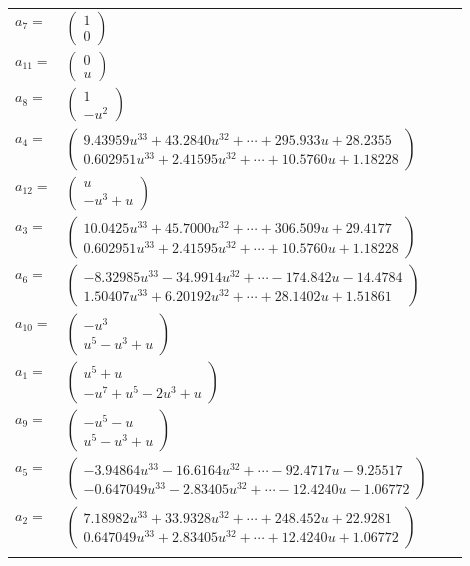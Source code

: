 \documentclass[1p]{elsarticle_modified}
\theoremstyle{definition}
\begin{document}
\begin{tabular}{m{7pt} m{180pt} m{7pt} m{180pt} }
\flushright $a_{7}=$&$\begin{pmatrix}1\\0\end{pmatrix}$ \\
\flushright $a_{11}=$&$\begin{pmatrix}0\\u\end{pmatrix}$ \\
\flushright $a_{8}=$&$\begin{pmatrix}1\\- u^2\end{pmatrix}$ \\
\flushright $a_{4}=$&$\begin{pmatrix}9.43959 u^{33}+43.2840 u^{32}+\cdots+295.933 u+28.2355\\0.602951 u^{33}+2.41595 u^{32}+\cdots+10.5760 u+1.18228\end{pmatrix}$ \\
\flushright $a_{12}=$&$\begin{pmatrix}u\\- u^3+u\end{pmatrix}$ \\
\flushright $a_{3}=$&$\begin{pmatrix}10.0425 u^{33}+45.7000 u^{32}+\cdots+306.509 u+29.4177\\0.602951 u^{33}+2.41595 u^{32}+\cdots+10.5760 u+1.18228\end{pmatrix}$ \\
\flushright $a_{6}=$&$\begin{pmatrix}-8.32985 u^{33}-34.9914 u^{32}+\cdots-174.842 u-14.4784\\1.50407 u^{33}+6.20192 u^{32}+\cdots+28.1402 u+1.51861\end{pmatrix}$ \\
\flushright $a_{10}=$&$\begin{pmatrix}- u^3\\u^5- u^3+u\end{pmatrix}$ \\
\flushright $a_{1}=$&$\begin{pmatrix}u^5+u\\- u^7+u^5-2 u^3+u\end{pmatrix}$ \\
\flushright $a_{9}=$&$\begin{pmatrix}- u^5- u\\u^5- u^3+u\end{pmatrix}$ \\
\flushright $a_{5}=$&$\begin{pmatrix}-3.94864 u^{33}-16.6164 u^{32}+\cdots-92.4717 u-9.25517\\-0.647049 u^{33}-2.83405 u^{32}+\cdots-12.4240 u-1.06772\end{pmatrix}$ \\
\flushright $a_{2}=$&$\begin{pmatrix}7.18982 u^{33}+33.9328 u^{32}+\cdots+248.452 u+22.9281\\0.647049 u^{33}+2.83405 u^{32}+\cdots+12.4240 u+1.06772\end{pmatrix}$\\&\end{tabular}
\end{document}
